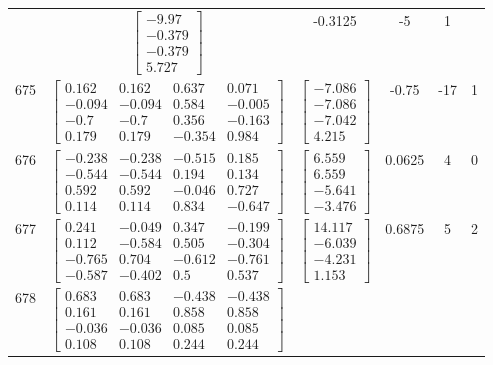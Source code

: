 \documentclass[a4paper,12pt]{article}
\begin{document}
\begin{tabular}{c c c c c c}
&
$\begin{bmatrix} -9.97 \\ -0.379 \\ -0.379 \\ 5.727 \end{bmatrix}$
&
-0.3125
&
-5
&
1
\\
675
&
$\begin{bmatrix} 0.162 & 0.162 & 0.637 & 0.071 \\ -0.094 & -0.094 & 0.584 & -0.005 \\ -0.7 & -0.7 & 0.356 & -0.163 \\ 0.179 & 0.179 & -0.354 & 0.984 \end{bmatrix}$
&
$\begin{bmatrix} -7.086 \\ -7.086 \\ -7.042 \\ 4.215 \end{bmatrix}$
&
-0.75
&
-17
&
1
\\
676
&
$\begin{bmatrix} -0.238 & -0.238 & -0.515 & 0.185 \\ -0.544 & -0.544 & 0.194 & 0.134 \\ 0.592 & 0.592 & -0.046 & 0.727 \\ 0.114 & 0.114 & 0.834 & -0.647 \end{bmatrix}$
&
$\begin{bmatrix} 6.559 \\ 6.559 \\ -5.641 \\ -3.476 \end{bmatrix}$
&
0.0625
&
4
&
0
\\
677
&
$\begin{bmatrix} 0.241 & -0.049 & 0.347 & -0.199 \\ 0.112 & -0.584 & 0.505 & -0.304 \\ -0.765 & 0.704 & -0.612 & -0.761 \\ -0.587 & -0.402 & 0.5 & 0.537 \end{bmatrix}$
&
$\begin{bmatrix} 14.117 \\ -6.039 \\ -4.231 \\ 1.153 \end{bmatrix}$
&
0.6875
&
5
&
2
\\
678
&
$\begin{bmatrix} 0.683 & 0.683 & -0.438 & -0.438 \\ 0.161 & 0.161 & 0.858 & 0.858 \\ -0.036 & -0.036 & 0.085 & 0.085 \\ 0.108 & 0.108 & 0.244 & 0.244 \end{bmatrix}$

\end{tabular}
\end{document}
